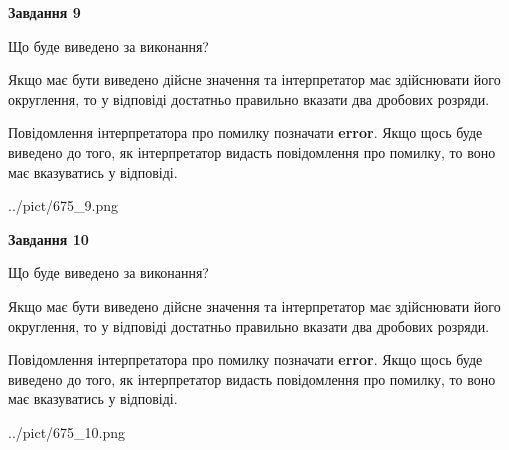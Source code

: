 \documentclass[12pt, ukrainian]{article}
\begin{document}
{\begin {Large}
{\begin {center}\textbf{Завдання 9}\end {center}}\par
Що буде виведено за виконання? \par

Якщо має бути виведено дійсне значення та інтерпретатор має здійснювати його округлення, 
то у відповіді достатньо правильно вказати два дробових розряди.

Повідомлення інтерпретатора про помилку позначати \textbf{error}.
Якщо щось буде виведено до того, як інтерпретатор видасть повідомлення про помилку, 
то воно має вказуватись у відповіді. \par

\begin{center}
	{../pict/675_9.png}
\end{center}
\newpage

{\begin {center}\textbf{Завдання 10}\end {center}}\par
Що буде виведено за виконання? \par

Якщо має бути виведено дійсне значення та інтерпретатор має здійснювати його округлення, 
то у відповіді достатньо правильно вказати два дробових розряди.

Повідомлення інтерпретатора про помилку позначати \textbf{error}.
Якщо щось буде виведено до того, як інтерпретатор видасть повідомлення про помилку, 
то воно має вказуватись у відповіді. \par

\begin{center}
	{../pict/675_10.png}
\end{center}
\newpage

\end {Large}}
\end{document}
